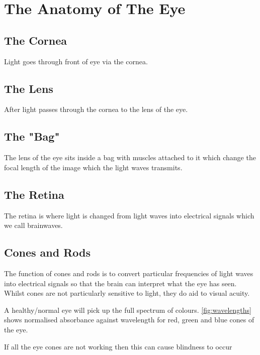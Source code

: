 
\chapter{The Anatomy of The Eye}

\label{anatomy} %


\section{The Cornea}

Light goes through front of eye via the cornea.

\section{The Lens}
After light passes through the cornea to the lens of the eye.

\section{The "Bag"}
The lens of the eye sits inside a bag with muscles attached to it which change
the focal length of the image which the light waves transmits.

\section{The Retina}
The retina is where light is changed from light waves into electrical signals
which we call brainwaves.

\section{Cones and Rods}

The function of cones and rods is to convert particular frequencies of light
waves
into electrical signals so that the brain can interpret what the eye has seen.
Whilst cones are not particularly sensitive to light, they do aid to visual
acuity.
\cite{}

A healthy/normal eye will pick up the full spectrum of colours.
\ref{fig:wavelengths} shows normalised absorbance against wavelength for red,
green and blue cones of the eye.

If all the eye cones are not working then this can cause
blindness to occur\cite{}
